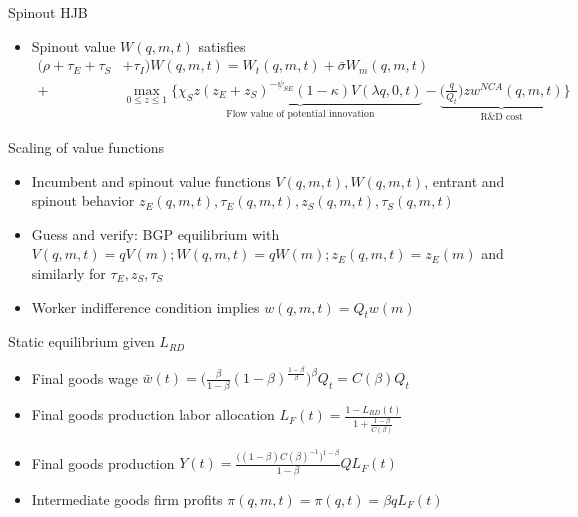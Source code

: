 \documentclass[english,usenames,dvipsnames]{beamer}
\begin{document}
\begin{frame}{Spinout HJB}\label{HJB_spinout}
\hyperlink{closing_the_model}{}
\begin{itemize}
	\item Spinout value $W(q,m,t)$ satisfies
	\footnotesize
	\begin{align*}
	(\rho  + \tau_E + \tau_S& + \tau_I)W(q,m,t) = W_t(q,m,t) + \bar{\sigma}W_m(q,m,t) \nonumber \\
	+& \max_{0 \le z \le 1} \Big\{ \underbrace{\chi_S z (z_E + z_S)^{-\psi_{SE}} (1-\kappa) V(\lambda q,0,t)}_{\textrm{Flow value of potential innovation}} - \underbrace{\Big(\frac{q}{Q_t}\Big) z w^{NCA}(q,m,t)}_{\textrm{R\&D cost}} \Big\} 
	\end{align*}
\end{itemize}
\end{frame}


\begin{frame}{Scaling of value functions}\label{scaling_of_value_functions}
\hyperlink{closing_the_model}{}
\begin{itemize}
	\item Incumbent and spinout value functions $V(q,m,t),W(q,m,t)$, entrant and spinout behavior $z_E(q,m,t),\tau_E(q,m,t),z_S(q,m,t),\tau_S(q,m,t)$ 
	\item Guess and verify: BGP equilibrium with $V(q,m,t) = qV(m); W(q,m,t) = qW(m); z_E(q,m,t) = z_E(m)$ and similarly for $\tau_E,z_S,\tau_S$
	\item Worker indifference condition implies $w(q,m,t) = Q_t w(m)$ 
\end{itemize}
\end{frame}

\begin{frame}{Static equilibrium given $L_{RD}$}\label{static_eq_conditions}
\hyperlink{closing_the_model}{}
\begin{itemize}
	\item Final goods wage $\bar{w}(t) = \Big(\frac{\beta}{1-\beta} (1-\beta)^{\frac{1-\beta}{\beta}} \Big)^{\beta} Q_t = C(\beta) Q_t$
	\item Final goods production labor allocation $L_F(t) = \frac{1 - L_{RD}(t)}{1 + \frac{1-\beta}{C(\beta)}}$
	\item Final goods production $Y(t) = \frac{\Big((1-\beta)C(\beta)^{-1}\Big)^{1-\beta}}{1-\beta} Q L_F(t)$
	\item Intermediate goods firm profits $\pi(q,m,t) = \pi(q,t) = \beta q L_F(t)$ 
\end{itemize}
\end{frame}
\end{document}
